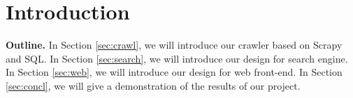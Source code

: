 \section{Introduction} \label{sec:intro}







\noindent \textbf{Outline.} In Section \ref{sec:crawl}, we will introduce our crawler based on Scrapy and SQL. In Section \ref{sec:search}, we will introduce our design for search engine. In Section \ref{sec:web}, we will introduce our design for web front-end. In Section \ref{sec:concl}, we will give a demonstration of the results of our project.